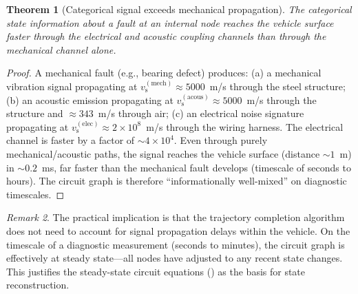 \documentclass[twocolumn,10pt,a4paper]{article}
\newtheorem{theorem}{Theorem}[section]
\theoremstyle{definition}
\theoremstyle{remark}
\newtheorem{remark}[theorem]{Remark}
\newcommand{\vs}{v_{\mathrm{s}}}
\begin{document}
\begin{theorem}[Categorical signal exceeds mechanical propagation]\label{thm:signal_exceeds}
The categorical state information about a fault at an internal node reaches the vehicle surface faster through the electrical and acoustic coupling channels than through the mechanical channel alone.
\end{theorem}

\begin{proof}
A mechanical fault (e.g., bearing defect) produces: (a) a mechanical vibration signal propagating at $\vs^{(\mathrm{mech})} \approx 5000$~m/s through the steel structure; (b) an acoustic emission propagating at $\vs^{(\mathrm{acous})} \approx 5000$~m/s through the structure and $\approx 343$~m/s through air; (c) an electrical noise signature propagating at $\vs^{(\mathrm{elec})} \approx 2 \times 10^8$~m/s through the wiring harness. The electrical channel is faster by a factor of $\sim 4 \times 10^4$. Even through purely mechanical/acoustic paths, the signal reaches the vehicle surface (distance $\sim 1$~m) in $\sim 0.2$~ms, far faster than the mechanical fault develops (timescale of seconds to hours). The circuit graph is therefore ``informationally well-mixed'' on diagnostic timescales.
\end{proof}

\begin{remark}
The practical implication is that the trajectory completion algorithm does not need to account for signal propagation delays within the vehicle. On the timescale of a diagnostic measurement (seconds to minutes), the circuit graph is effectively at steady state---all nodes have adjusted to any recent state changes. This justifies the steady-state circuit equations () as the basis for state reconstruction.
\end{remark}
\end{document}
